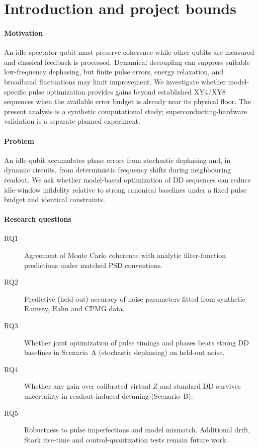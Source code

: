 \section{Introduction and project bounds}
\label{sec:intro}

\paragraph{Motivation} An idle spectator qubit must preserve coherence while
other qubits are measured and classical feedback is processed. Dynamical
decoupling can suppress suitable low-frequency dephasing, but finite pulse
errors, energy relaxation, and broadband fluctuations may limit improvement.
We investigate whether model-specific pulse optimization provides gains
beyond established XY4/XY8 sequences when the available error budget is
already near its physical floor. The present analysis is a synthetic
computational study; superconducting-hardware validation is a separate
planned experiment.

\paragraph{Problem} An idle qubit accumulates phase errors from stochastic dephasing and, in
dynamic circuits, from deterministic frequency shifts during neighbouring readout. We ask
whether model-based optimization of DD sequences can reduce idle-window infidelity relative to
strong canonical baselines under a fixed pulse budget and identical constraints.

\paragraph{Research questions}
\begin{description}
  \item[RQ1] Agreement of Monte Carlo coherence with analytic filter-function predictions under
    matched PSD conventions.
  \item[RQ2] Predictive (held-out) accuracy of noise parameters fitted from synthetic
    Ramsey, Hahn and CPMG data.
  \item[RQ3] Whether joint optimization of pulse timings and phases beats strong DD baselines in
    Scenario~A (stochastic dephasing) on held-out noise.
  \item[RQ4] Whether any gain over calibrated virtual-$Z$ and standard DD survives uncertainty
    in readout-induced detuning (Scenario~B).
  \item[RQ5] Robustness to pulse imperfections and model mismatch. Additional
    drift, Stark rise-time and control-quantization tests remain future work.
\end{description}

